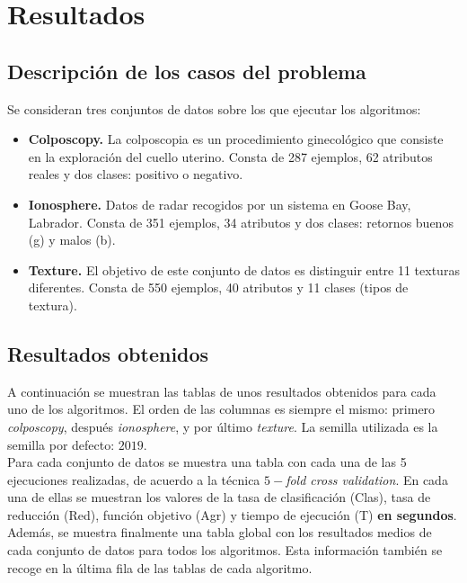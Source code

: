 \documentclass[12pt]{article}
\begin{document}
\newpage
\section{Resultados}

\subsection*{Descripción de los casos del problema}
\label{casos}

Se consideran tres conjuntos de datos sobre los que ejecutar los algoritmos:

\begin{itemize}
	\item \textbf{Colposcopy.} La colposcopia es un procedimiento ginecológico que
consiste en la exploración del cuello uterino. Consta de 287 ejemplos, 62 atributos reales y dos clases: positivo o negativo.
    \item \textbf{Ionosphere.} Datos de radar recogidos por un sistema en Goose Bay, Labrador. Consta de 351 ejemplos, 34 atributos y dos clases: retornos buenos (g) y malos (b).
    \item \textbf{Texture.} El objetivo de este conjunto de datos es distinguir entre 11
texturas diferentes. Consta de 550 ejemplos, 40 atributos y 11 clases (tipos de textura).
\end{itemize}

\subsection*{Resultados obtenidos}
\label{resultados}

A continuación se muestran las tablas de unos resultados obtenidos para cada uno de los algoritmos. El orden de las columnas es siempre el mismo: primero \textit{colposcopy}, después \textit{ionosphere}, y por último \textit{texture}. La semilla utilizada es la semilla por defecto: $2019$.\\

Para cada conjunto de datos se muestra una tabla con cada una de las 5 ejecuciones realizadas, de acuerdo a la técnica $5-$\textit{fold cross validation}. En cada una de ellas se muestran los valores de la tasa de clasificación (Clas), tasa de reducción (Red), función objetivo (Agr) y tiempo de ejecución (T) \textbf{en segundos}. Además, se muestra finalmente una tabla global con los resultados medios de cada conjunto de datos para todos los algoritmos. Esta información también se recoge en la última fila de las tablas de cada algoritmo.\\
\end{document}
